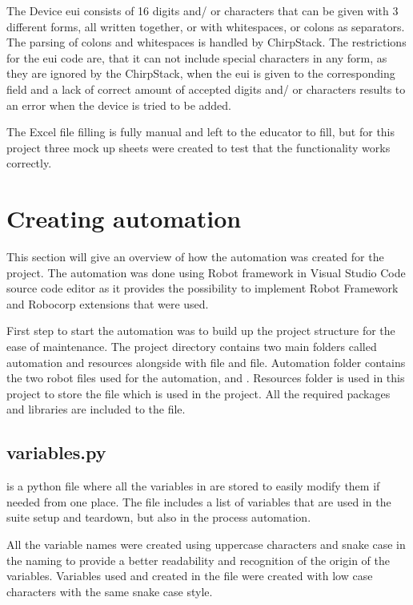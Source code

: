 The Device \gls{eui} consists of 16 digits and/ or characters that can be given with 3 different forms, all written together, or with whitespaces, or colons as separators.
The parsing of colons and whitespaces is handled by ChirpStack.
The restrictions for the \gls{eui} code are, that it can not include special characters in any form, as they are ignored by the ChirpStack, when the \gls{eui} is given to the corresponding field and a lack of correct amount of accepted digits and/ or characters results to an error when the device is tried to be added.

The Excel file filling is fully manual and left to the educator to fill, but for this project three mock up sheets were created to test that the functionality works correctly.

\section{Creating automation}
This section will give an overview of how the automation was created for the project.
The automation was done using Robot framework in Visual Studio Code source code editor as it provides the possibility to implement Robot Framework and Robocorp extensions that were used.

First step to start the automation was to build up the project structure for the ease of maintenance.
The project directory contains two main folders called automation and resources alongside with  file and  file.
Automation folder contains the two robot files used for the automation,  and .
Resources folder is used in this project to store the  file which is used in the project.
All the required packages and libraries are included to the  file.

\subsection{variables.py}
 is a python file where all the variables in are stored to easily modify them if needed from one place.
The  file includes a list of variables that are used in the suite setup and teardown, but also in the process automation.

All the variable names were created using uppercase characters and snake case in the naming to provide a better readability and recognition of the origin of the variables.
Variables used and created in the  file were created with low case characters with the same snake case style.

